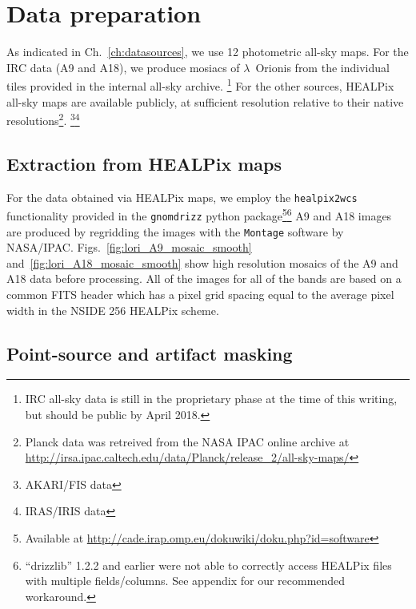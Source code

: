 	\section{Data preparation}
    \label{sec:dataprocessing}
		As indicated in Ch.~\ref{ch:datasources}, we use 12 photometric all-sky maps. For the IRC data (A9 and A18), we produce mosiacs of $\lambda$~Orionis from the individual tiles provided in the internal all-sky archive.
      \footnote{IRC all-sky data is still in the proprietary phase at the time of this writing, but should be public by April 2018.}
       For the other sources, HEALPix all-sky maps are available publicly, at sufficient resolution relative to their native resolutions\footnote{Planck data was retreived from the NASA IPAC online archive at \url{http://irsa.ipac.caltech.edu/data/Planck/release_2/all-sky-maps/}}. \footnote{AKARI/FIS data }\footnote{IRAS/IRIS data }

		\subsection{Extraction from HEALPix maps}
		  For the data obtained via HEALPix maps, we employ the {\tt healpix2wcs} functionality provided in the {\tt gnomdrizz} python package\footnote{Available at \url{http://cade.irap.omp.eu/dokuwiki/doku.php?id=software}}\footnote{``drizzlib'' 1.2.2 and earlier were not able to correctly access HEALPix files with multiple fields/columns. See appendix for our recommended workaround.} A9 and A18 images are produced by regridding the images with the {\tt Montage} software by NASA/IPAC. Figs.~\ref{fig:lori_A9_mosaic_smooth} and~\ref{fig:lori_A18_mosaic_smooth} show high resolution mosaics of the A9 and A18 data before processing. All of the images for all of the bands are based on a common FITS header which has a pixel grid spacing equal to the average pixel width in the NSIDE 256 HEALPix scheme.

      \subsection{Point-source and artifact masking}

